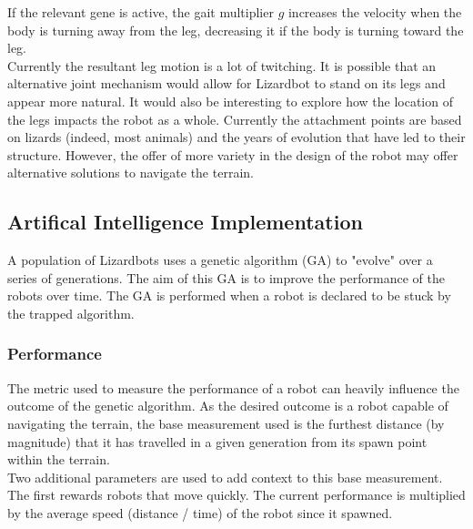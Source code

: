 \documentclass{article}
\begin{document}
\noindent If the relevant gene is active, the gait multiplier $g$ increases the velocity when the body is turning away from the leg, decreasing it if the body is turning toward the leg.\\

Currently the resultant leg motion is a lot of twitching. It is possible that an alternative joint mechanism would allow for Lizardbot to stand on its legs and appear more natural. It would also be interesting to explore how the location of the legs impacts the robot as a whole. Currently the attachment points are based on lizards (indeed, most animals) and the years of evolution that have led to their structure. However, the offer of more variety in the design of the robot may offer alternative solutions to navigate the terrain. 


\subsection{Artifical Intelligence Implementation}
\label{sec:AI Imp}
A population of Lizardbots uses a genetic algorithm (GA) to "evolve" over a series of generations. The aim of this GA is to improve the performance of the robots over time. The GA is performed when a robot is declared to be stuck by the trapped algorithm. 

\subsubsection{Performance}
\label{sec:Performance Imp}
The metric used to measure the performance of a robot can heavily influence the outcome of the genetic algorithm. As the desired outcome is a robot capable of navigating the terrain, the base measurement used is the furthest distance (by magnitude) that it has travelled in a given generation from its spawn point within the terrain. \\

Two additional parameters are used to add context to this base measurement. The first rewards robots that move quickly. The current performance is multiplied by the average speed (distance / time) of the robot since it spawned.\\
\end{document}
